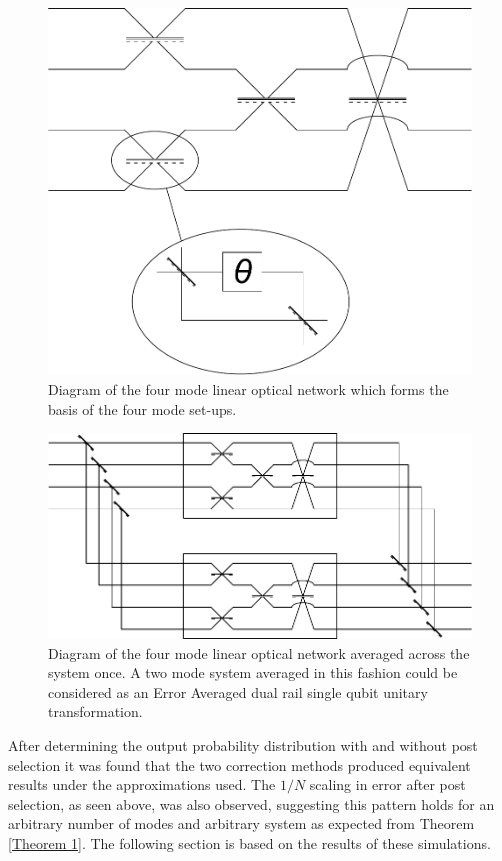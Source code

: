\documentclass[aps,pra,twocolumn,superscriptaddress,numerical,floatfix]{revtex4-1}
\begin{document}
\begin{figure}[h]
\centerline{\includegraphics[width=\columnwidth]{4_mode_system.pdf}}
\caption{Diagram of the four mode linear optical network which forms the basis of the four mode set-ups. \label{fig:4 mode basis diagram}}
\end{figure}

\begin{figure}[h]
\centerline{\includegraphics[width=\columnwidth]{4_mode_average_across.pdf}}
\caption{Diagram of the four mode linear optical network averaged across the system once. A two mode system averaged in this fashion could be considered as an Error Averaged dual rail single qubit unitary transformation. \label{fig: averaging 4 mode diagram}}
\end{figure}

After determining the output probability distribution with and without post selection it was found that the two correction methods produced equivalent results under the approximations used. The $1/N$ scaling in error after post selection, as seen above, was also observed, suggesting this pattern holds for an arbitrary number of modes and arbitrary system as expected from Theorem \ref{Theorem 1}. The following section is based on the results of these simulations.
\end{document}
